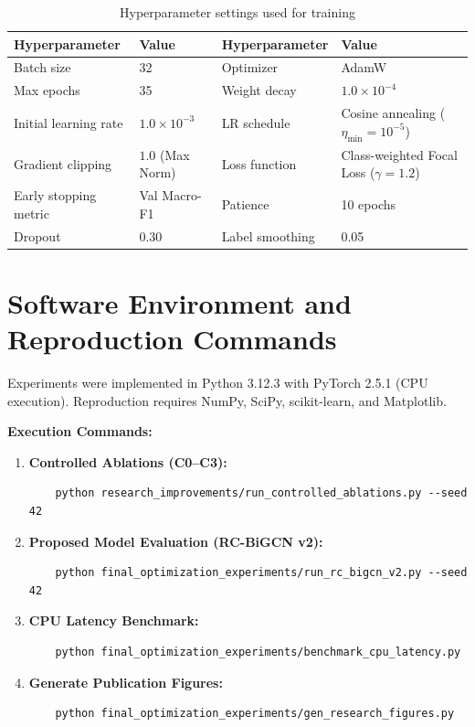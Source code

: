 \begin{table}[htbp]
\centering
\caption{Hyperparameter settings used for training}
\label{tab:reproduction-training-settings}
\small
\begin{tabular}{|l|l||l|l|}
\hline
\textbf{Hyperparameter} & \textbf{Value} & \textbf{Hyperparameter} & \textbf{Value} \\
\hline
Batch size & 32 & Optimizer & AdamW \\
Max epochs & 35 & Weight decay & $1.0 \times 10^{-4}$ \\
Initial learning rate & $1.0 \times 10^{-3}$ & LR schedule & Cosine annealing ($\eta_{\min} = 10^{-5}$) \\
Gradient clipping & $1.0$ (Max Norm) & Loss function & Class-weighted Focal Loss ($\gamma = 1.2$) \\
Early stopping metric & Val Macro-F1 & Patience & 10 epochs \\
Dropout & 0.30 & Label smoothing & 0.05 \\
\hline
\end{tabular}
\end{table}

\section{Software Environment and Reproduction Commands}

Experiments were implemented in Python 3.12.3 with PyTorch 2.5.1 (CPU execution). Reproduction requires NumPy, SciPy, scikit-learn, and Matplotlib.

\textbf{Execution Commands:}
\begin{enumerate}
    \item \textbf{Controlled Ablations (C0--C3):}
    \begin{verbatim}
    python research_improvements/run_controlled_ablations.py --seed 42
    \end{verbatim}
    \item \textbf{Proposed Model Evaluation (RC-BiGCN v2):}
    \begin{verbatim}
    python final_optimization_experiments/run_rc_bigcn_v2.py --seed 42
    \end{verbatim}
    \item \textbf{CPU Latency Benchmark:}
    \begin{verbatim}
    python final_optimization_experiments/benchmark_cpu_latency.py
    \end{verbatim}
    \item \textbf{Generate Publication Figures:}
    \begin{verbatim}
    python final_optimization_experiments/gen_research_figures.py
    \end{verbatim}
\end{enumerate}

